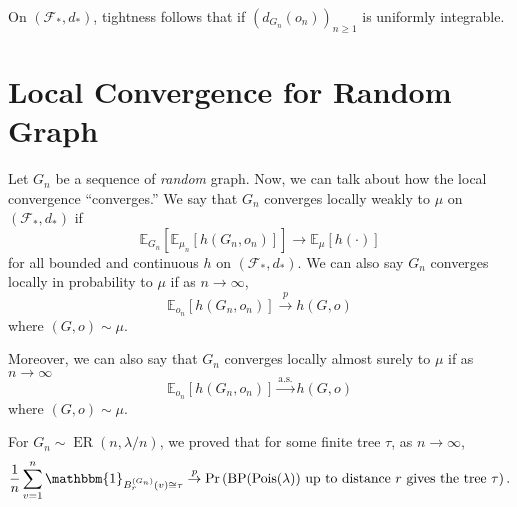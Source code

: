 On \((\mathcal{F} _{\ast} , d_{\ast} )\), tightness follows that if \((d_{G_n}(o_n))_{n \geq 1}\) is uniformly integrable.

\section{Local Convergence for Random Graph}

Let \(G_n\) be a sequence of \emph{random} graph. Now, we can talk about how the local convergence ``converges.'' We say that \(G_n\) converges locally weakly to \(\mu \) on \((\mathcal{F} _{\ast} , d_{\ast} )\) if
\[
	\mathbb{E}_{G_n}[\mathbb{E}_{\mu _n}[h(G_n, o_n)] ]
	\to \mathbb{E}_{\mu }[h(\cdot)]
\]
for all bounded and continuous \(h\) on \((\mathcal{F} _{\ast} , d_{\ast} )\). We can also say \(G_n\) converges locally in probability to \(\mu \) if as \(n \to \infty \),
\[
	\mathbb{E}_{o_n}[h(G_n, o_n)]
	\overset{p}{\to} h(G, o)
\]
where \((G, o) \sim \mu \).

Moreover, we can also say that \(G_n\) converges locally almost surely to \(\mu \) if as \(n \to \infty \)
\[
	\mathbb{E}_{o_n}[h(G_n, o_n)]
	\overset{\text{a.s.} }{\to} h(G, o)
\]
where \((G, o) \sim \mu \).

\begin{eg}
	For \(G_n \sim \operatorname{ER}(n, \lambda / n) \), we proved that for some finite tree \(\tau \), as \(n \to \infty \),
	\[
		\frac{1}{n} \sum_{v=1}^{n} \mathbbm{1}_{B_r^{(G_n)}(v) \cong \tau }
		\overset{p}{\to} \Pr_{}\left(\operatorname{BP}(\operatorname{Pois}(\lambda ) ) \text{ up to distance \(r\) gives the tree \(\tau\)}  \right).
	\]
\end{eg}